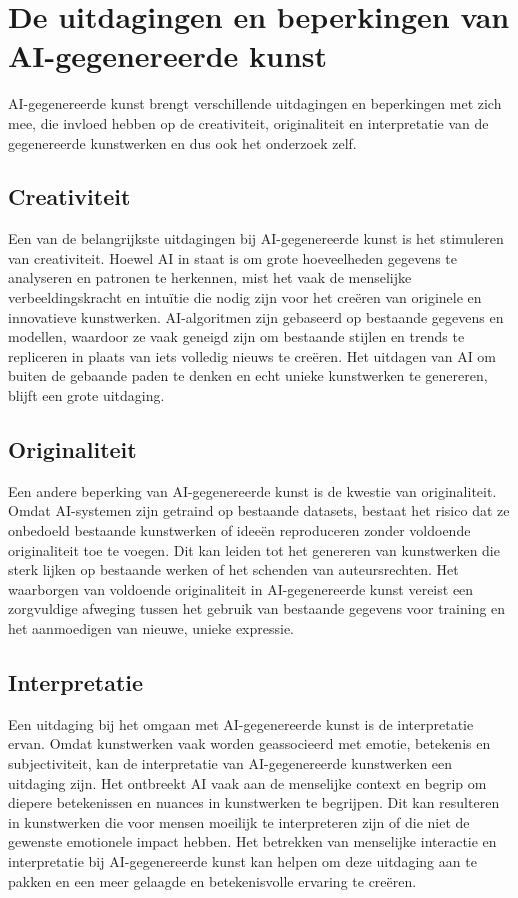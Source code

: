 \section{De uitdagingen en beperkingen van AI-gegenereerde kunst}
AI-gegenereerde kunst brengt verschillende uitdagingen en beperkingen met zich mee, die invloed hebben op de creativiteit, originaliteit en interpretatie van de gegenereerde kunstwerken en dus ook het onderzoek zelf.

\subsection{Creativiteit}
Een van de belangrijkste uitdagingen bij AI-gegenereerde kunst is het stimuleren van creativiteit. Hoewel AI in staat is om grote hoeveelheden gegevens te analyseren en patronen te herkennen, mist het vaak de menselijke verbeeldingskracht en intuïtie die nodig zijn voor het creëren van originele en innovatieve kunstwerken. AI-algoritmen zijn gebaseerd op bestaande gegevens en modellen, waardoor ze vaak geneigd zijn om bestaande stijlen en trends te repliceren in plaats van iets volledig nieuws te creëren. Het uitdagen van AI om buiten de gebaande paden te denken en echt unieke kunstwerken te genereren, blijft een grote uitdaging.

\subsection{Originaliteit}
Een andere beperking van AI-gegenereerde kunst is de kwestie van originaliteit. Omdat AI-systemen zijn getraind op bestaande datasets, bestaat het risico dat ze onbedoeld bestaande kunstwerken of ideeën reproduceren zonder voldoende originaliteit toe te voegen. Dit kan leiden tot het genereren van kunstwerken die sterk lijken op bestaande werken of het schenden van auteursrechten. Het waarborgen van voldoende originaliteit in AI-gegenereerde kunst vereist een zorgvuldige afweging tussen het gebruik van bestaande gegevens voor training en het aanmoedigen van nieuwe, unieke expressie.

\subsection{Interpretatie}
Een uitdaging bij het omgaan met AI-gegenereerde kunst is de interpretatie ervan. Omdat kunstwerken vaak worden geassocieerd met emotie, betekenis en subjectiviteit, kan de interpretatie van AI-gegenereerde kunstwerken een uitdaging zijn. Het ontbreekt AI vaak aan de menselijke context en begrip om diepere betekenissen en nuances in kunstwerken te begrijpen. Dit kan resulteren in kunstwerken die voor mensen moeilijk te interpreteren zijn of die niet de gewenste emotionele impact hebben. Het betrekken van menselijke interactie en interpretatie bij AI-gegenereerde kunst kan helpen om deze uitdaging aan te pakken en een meer gelaagde en betekenisvolle ervaring te creëren.

